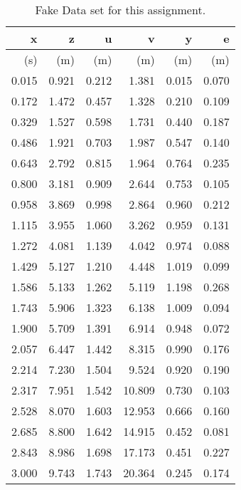 \documentclass[aps,secnumarabic,balancelastpage,amsmath,amssymb,nofootinbib]{revtex4-1}
\begin{document}
	\begin{table}[h]
	\caption{\label{tab:stone} Fake Data set for this assignment.}
	\begin{ruledtabular}
	\begin{tabular}{rrrrrr}
	 x 	&	z	&	u	&	v	&	y	&	e \\
	\hline
	(s) 	&	(m)	&	(m)	&	(m)	&	(m)	&	(m)\\
	\hline
0.015	&	0.921	&	0.212	&	1.381	&	0.015	&	0.070 \\
0.172	&	1.472	&	0.457	&	1.328	&	0.210	&	0.109 \\
0.329	&	1.527	&	0.598	&	1.731	&	0.440	&	0.187 \\
0.486	&	1.921	&	0.703	&	1.987	&	0.547	&	0.140\\
0.643	&	2.792	&	0.815	&	1.964	&	0.764	&	0.235\\
0.800	&	3.181	&	0.909	&	2.644	&	0.753	&	0.105\\
0.958	&	3.869	&	0.998	&	2.864	&	0.960	&	0.212\\
1.115	&	3.955	&	1.060	&	3.262	&	0.959	&	0.131\\
1.272	&	4.081	&	1.139	&	4.042	&	0.974	&	0.088\\
1.429	&	5.127	&	1.210	&	4.448	&	1.019	&	0.099\\
1.586	&	5.133	&	1.262	&	5.119	&	1.198	&	0.268\\
1.743	&	5.906	&	1.323	&	6.138	&	1.009	&	0.094\\
1.900	&	5.709	&	1.391	&	6.914	&	0.948	&	0.072\\
2.057	&	6.447	&	1.442	&	8.315	&	0.990	&	0.176\\
2.214	&	7.230	&	1.504	&	9.524	&	0.920	&	0.190\\
2.317	&	7.951	&	1.542	&	10.809	&	0.730	&	0.103\\
2.528	&	8.070	&	1.603	&	12.953	&	0.666	&	0.160\\
2.685	&	8.800	&	1.642	&	14.915	&	0.452	&	0.081\\
2.843	&	8.986	&	1.698	&	17.173	&	0.451	&	0.227\\
3.000	&	9.743	&	1.743	&	20.364	&	0.245	&	0.174\\
	
	
	
	\end{tabular}
	\end{ruledtabular}
	\end{table}
\end{document}
